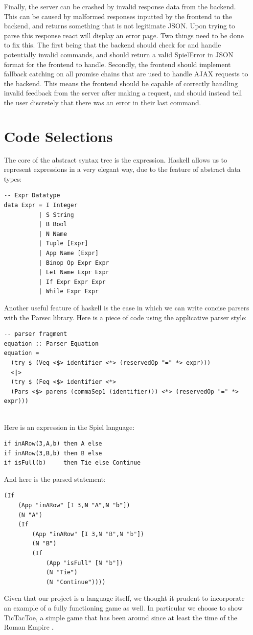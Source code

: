 \documentclass[onecolumn, draftclsnofoot,10pt, compsoc]{IEEEtran}
\begin{document}
\begin{singlespace}
    Finally, the server can be crashed by invalid response data from the backend. This can be caused by malformed responses inputted by the frontend to the backend, and returns something that is not legitimate JSON. Upon trying to parse this response react will display an error page. Two things need to be done to fix this. The first being that the backend should check for and handle potentially invalid commands, and should return a valid SpielError in JSON format for the frontend to handle. Secondly, the frontend should implement fallback catching on all promise chains that are used to handle AJAX requests to the backend. This means the frontend should be capable of correctly handling invalid feedback from the server after making a request, and should instead tell the user discretely that there was an error in their last command.
    
\section{Code Selections}
The core of the abstract syntax tree is the expression. Haskell allows us to represent expressions in a very elegant way, due to the feature of abstract data types:
\begin{verbatim}
-- Expr Datatype
data Expr = I Integer
          | S String
          | B Bool
          | N Name
          | Tuple [Expr]
          | App Name [Expr]
          | Binop Op Expr Expr
          | Let Name Expr Expr
          | If Expr Expr Expr
          | While Expr Expr
\end{verbatim}
Another useful feature of haskell is the ease in which we can write concise parsers with the Parsec library. Here is a piece of code using the applicative parser style:
\begin{verbatim}
-- parser fragment
equation :: Parser Equation
equation =
  (try $ (Veq <$> identifier <*> (reservedOp "=" *> expr)))
  <|>
  (try $ (Feq <$> identifier <*> 
  (Pars <$> parens (commaSep1 (identifier))) <*> (reservedOp "=" *> expr)))
  
\end{verbatim}
Here is an expression in the Spiel language:
\begin{lstlisting}
if inARow(3,A,b) then A else
if inARow(3,B,b) then B else
if isFull(b)     then Tie else Continue
\end{lstlisting}
And here is the parsed statement:
\begin{verbatim}
(If
    (App "inARow" [I 3,N "A",N "b"]) 
    (N "A")
    (If
        (App "inARow" [I 3,N "B",N "b"]) 
        (N "B")
        (If 
            (App "isFull" [N "b"]) 
            (N "Tie") 
            (N "Continue"))))
\end{verbatim}
Given that our project is a language itself, we thought it prudent to incorporate an example of a fully functioning game as well. In particular we choose to show TicTacToe, a simple game that has been around since at least the time of the Roman Empire \cite{tictactoe_origin}.



\end{singlespace}
\end{document}
